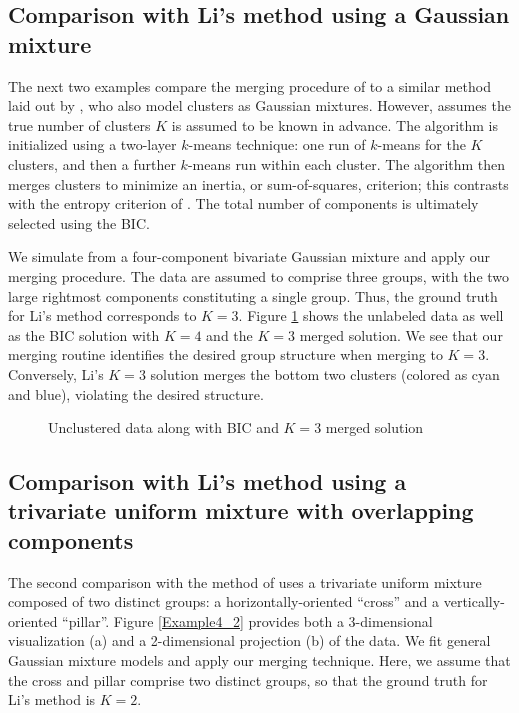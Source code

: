 \documentclass{uwstat572}
\renewcommand\;{\,}
\begin{document}
\subsection{Comparison with Li's method using a Gaussian mixture}
The next two examples compare the merging procedure of \cite{Baudry10} to a similar method laid out by \cite{Li05}, who also model clusters as Gaussian mixtures.
However, \cite{Li05} assumes the true number of clusters $K$ is assumed to be known in advance.
The algorithm is initialized using a two-layer $k$-means technique: one run of $k$-means for the $K$ clusters, and then a further $k$-means run within each cluster. 
The algorithm then merges clusters to minimize an inertia, or sum-of-squares, criterion; this contrasts with the entropy criterion of \cite{Baudry10}.
The total number of components is ultimately selected using the BIC.

We simulate from a four-component bivariate Gaussian mixture and apply our merging procedure.
The data are assumed to comprise three groups, with the two large rightmost components constituting a single group.
Thus, the ground truth for Li's method corresponds to $K = 3$.
Figure \ref{Example4_1} shows the unlabeled data as well as the BIC solution with $K = 4$ and the $K = 3$ merged solution.
We see that our merging routine identifies the desired group structure when merging to $K = 3$.
Conversely, Li's $K = 3$ solution merges the bottom two clusters (colored as cyan and blue), violating the desired structure.


\begin{figure}\label{Example4_1}
\begin{center}
\end{center}
\caption{Unclustered data along with BIC and $K = 3$ merged solution}
\end{figure}

\subsection{Comparison with Li's method using a trivariate uniform mixture with overlapping components}
The second comparison with the method of \cite{Li05} uses a trivariate uniform mixture composed of two distinct groups: a horizontally-oriented ``cross'' and a vertically-oriented ``pillar''.
Figure \ref{Example4_2} provides both a 3-dimensional visualization (a) and a 2-dimensional projection (b) of the data.
We fit general Gaussian mixture models and apply our merging technique.
Here, we assume that the cross and pillar comprise two distinct groups, so that the ground truth for Li's method is $K = 2$. 
\end{document}
